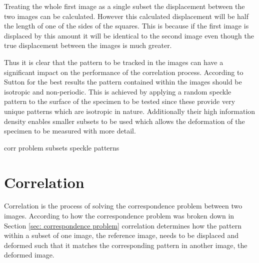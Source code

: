 \documentclass[12pt,oneside,openany,a4paper, %
english, %
masters-t, goldenblock]{usthesis}
\begin{document}
Treating the whole first image as a single subset the displacement between the two images can be calculated. However this calculated displacement will be half the length of one of the sides of the squares. This is because if the first image is displaced by this amount it will be identical to the second image even though the true displacement between the images is much greater.

Thus it is clear that the pattern to be tracked in the images can have a significant impact on the performance of the correlation process. According to Sutton \cite{sutton2009image} for the best results the pattern contained within the images should be isotropic and non-periodic. This is achieved by applying a random speckle pattern to the surface of the specimen to be tested since these provide very unique patterns which are isotropic in nature. Additionally their high information density enables smaller subsets to be used which allows the deformation of the specimen to be measured with more detail.










corr problem
subsets
speckle patterns 

\section{Correlation}
Correlation is the process of solving the correspondence problem between two images. According to how the correspondence problem was broken down in Section \ref{sec: correspondence problem} correlation determines how the pattern within a subset of one image, the reference image, needs to be displaced and deformed such that it matches the corresponding pattern in another image, the deformed image.
\end{document}

